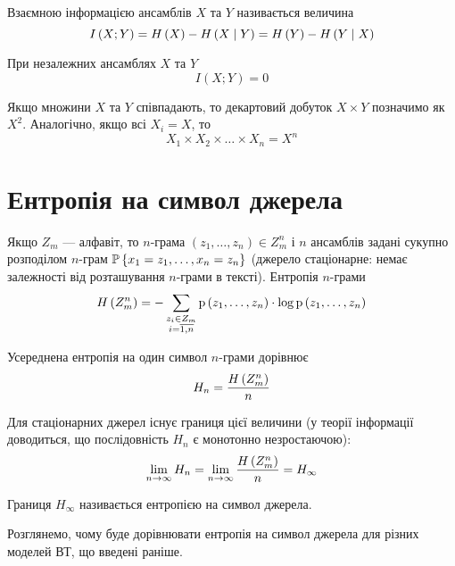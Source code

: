 \begin{definition}
    Взаємною інформацією ансамблів $X$ та $Y$ називається величина 
    $$I\left( X; Y \right)
        = H\left( X \right)-H\left( X \;\middle|\; Y \right)
        = H\left( Y \right)-H\left( Y \;\middle|\; X \right)$$

    При незалежних ансамблях $X$ та $Y$
    $$I\left( X; Y \right) = 0$$
\end{definition}

Якщо множини $X$ та $Y$ співпадають, то декартовий добуток
$X \times Y$ позначимо як  $X^2$.
Аналогічно, якщо всі $X_i=X$, то
$$X_1 \times X_2 \times \dots \times X_n=X^n$$

\section{Ентропія на символ джерела}

Якщо $Z_m$ --- алфавіт, то $n$-грама 
$\left( z_{1},\dots,z_{n} \right) \in Z_{m}^{n}$ і $n$
ансамблів задані сукупно розподілом $n$-грам 
$\mathbb{P}\left\{ x_{1}=z_{1},\dots,x_{n}=z_{n} \right\}$
(джерело стаціонарне: немає залежності від розташування $n$-грами в тексті).
Ентропія $n$-грами
\begin{equation}\label{eq:nGramEntropy}
    H\left( Z_m^n \right)
        = - \sum_{\substack{z_i \in Z_m \\ i = \overline{1,n}}}
            \mathrm{p}\left(z_1, \dots, z_n\right) \cdot \log{\mathrm{p}\left(z_1, \dots, z_n\right)}
\end{equation}

Усереднена ентропія на один символ $n${}-грами дорівнює 
$$H_{n}=\frac{H\left( Z_m^n \right)}{n}$$

Для стаціонарних джерел існує границя цієї величини (у теорії інформації
доводиться, що послідовність  $H_{n}$ є монотонно незростаючою):
$$\lim_{n\to\infty}H_{n}
    =\lim_{n\to\infty}\frac{H\left( Z_m^n \right)}{n}
    =H_{\infty}$$

\begin{definition}
Границя $H_\infty$ називається ентропією на символ джерела. 
\end{definition}


Розглянемо, чому буде дорівнювати ентропія на символ джерела для різних моделей
ВТ, що введені раніше.

